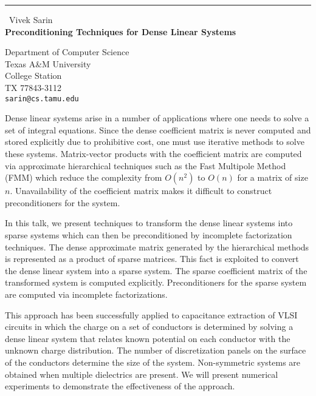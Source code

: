 \documentclass{report}
\begin{document}
\begin{center}
\rule{6in}{1pt} \
{\large Vivek Sarin \\
{\bf Preconditioning Techniques for Dense Linear Systems}}

Department of Computer Science \\ Texas A\&M University \\ College Station \\ TX 77843-3112
\\
{\tt sarin@cs.tamu.edu}\end{center}

Dense linear systems arise in a number of applications where one needs to
solve a set of integral equations. Since the dense coefficient matrix is
never computed and stored explicitly due to prohibitive cost, one must
use iterative methods to solve these systems. Matrix-vector products with
the coefficient matrix are computed via approximate hierarchical
techniques such as the Fast Multipole Method (FMM) which reduce the
complexity from $O(n^2)$ to $O(n)$ for a matrix of size $n$.
Unavailability of the coefficient matrix makes it difficult to construct
preconditioners for the system.


In this talk, we present techniques to transform the dense linear systems
into sparse systems which can then be preconditioned by incomplete
factorization techniques. The dense approximate matrix generated by the
hierarchical methods is represented as a product of sparse matrices. This
fact is exploited to convert the dense linear system into a sparse
system. The sparse coefficient matrix of the transformed system is
computed explicitly. Preconditioners for the sparse system are computed
via incomplete factorizations.


This approach has been successfully applied to capacitance extraction of
VLSI circuits in which the charge on a set of conductors is determined by
solving a dense linear system that relates known potential on each
conductor with the unknown charge distribution. The number of
discretization panels on the surface of the conductors determine the size
of the system. Non-symmetric systems are obtained when multiple
dielectrics are present. We will present numerical experiments to
demonstrate the effectiveness of the approach.
\end{document}
